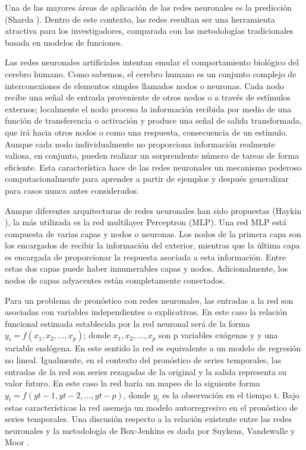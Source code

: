 \hspace*{0.4 cm} Una de las mayores \'areas de aplicaci\'on de las redes neuronales es la predicci\'on (Sharda \cite{SH}). Dentro de este contexto, las redes resultan ser una herramienta atractiva para los investigadores, comparada con las metodolog\'ias tradicionales basada en modelos de funciones.

\hspace*{0.4 cm} Las redes neuronales artificiales intentan emular el comportamiento biol\'ogico del cerebro humano. Como sabemos, el cerebro humano es un conjunto complejo de interconexiones de elementos simples llamados nodos o neuronas. Cada nodo recibe una se\~nal de entrada proveniente de otros nodos o a trav\'es de est\'imulos externos; localmente el nodo procesa la informaci\'on recibida por medio de una funci\'on de transferencia o activaci\'on y produce una se\~nal de salida transformada, que ir\'a hacia otros nodos o como una respuesta, consecuencia de un est\'imulo. Aunque cada nodo individualmente no proporciona informaci\'on realmente valiosa, en conjunto, pueden realizar un sorprendente n\'umero de tareas de forma eficiente. Esta caracter\'istica hace de las redes neuronales un mecanismo poderoso computacionalmente para aprender a partir de ejemplos y despu\'es generalizar para casos nunca antes considerados.


\hspace*{0.4 cm} Aunque diferentes arquitecturas de redes neuronales han sido propuestas (Haykin \cite{Ha}), la m\'as utilizada es la red multilayer Perceptron (MLP). Una red MLP est\'a compuesta de varias capas y nodos o neuronas. Los nodos de la primera capa son los encargados de recibir la informaci\'on del exterior, mientras que la \'ultima capa es encargada de proporcionar la respuesta asociada a esta informaci\'on. Entre estas dos capas puede haber innumerables capas y nodos. Adicionalmente, los nodos de capas adyacentes est\'an completamente conectados.

\hspace*{0.4 cm} Para un problema de pron\'ostico con redes neuronales, las entradas a la red son asociadas con variables independientes o explicativas. En este caso la relaci\'on funcional estimada establecida por la red neuronal ser\'a de la forma $y_{t}=f(x_{1}, x_{2},..., x_{p})$; donde $x_{1}, x_{2},..., x_{p}$ son p variables ex\'ogenas y y una variable end\'ogena. En este sentido la red es equivalente a un modelo de regresi\'on no lineal. Igualmente, en el contexto del pron\'ostico de series temporales, las entradas de la red son series rezagadas de la original y la salida representa su valor futuro. En este caso la red har\'ia un mapeo de la siguiente forma $y_{t}= f (y{t-1}, y{t-2}, ..., y{t-p})$, donde $y_{t}$ es la observaci\'on en el tiempo t. Bajo estas caracter\'isticas la red asemeja un modelo autorregresivo en el pron\'ostico de series temporales. Una discusi\'on respecto a la relaci\'on existente entre las redes neuronales y la metodolog\'ia de Box-Jenkins es dada por Suykens, Vandewalle y Moor \cite{SVM}.

